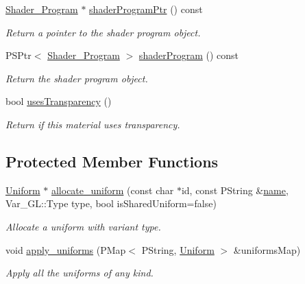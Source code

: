 \begin{DoxyCompactItemize}
\mbox{\hyperlink{classprz_1_1_shader___program}{Shader\+\_\+\+Program}} $\ast$ \mbox{\hyperlink{classprz_1_1_material_aee5bc4a466d97ffff49ff02bbc41bae6}{shader\+Program\+Ptr}} () const
\begin{DoxyCompactList}\small\item\em Return a pointer to the shader program object. \end{DoxyCompactList}\item 
P\+S\+Ptr$<$ \mbox{\hyperlink{classprz_1_1_shader___program}{Shader\+\_\+\+Program}} $>$ \mbox{\hyperlink{classprz_1_1_material_a258f2af6b3141b29ecc1c07968da1e0a}{shader\+Program}} () const
\begin{DoxyCompactList}\small\item\em Return the shader program object. \end{DoxyCompactList}\item 
bool \mbox{\hyperlink{classprz_1_1_material_aa27abc0a7c69fa88cac4d075a082d78c}{uses\+Transparency}} ()
\begin{DoxyCompactList}\small\item\em Return if this material uses transparency. \end{DoxyCompactList}\end{DoxyCompactItemize}
\subsection*{Protected Member Functions}
\begin{DoxyCompactItemize}
\item 
\mbox{\hyperlink{structprz_1_1_uniform}{Uniform}} $\ast$ \mbox{\hyperlink{classprz_1_1_material_ae87c21c227dbbc14239a8c375b751720}{allocate\+\_\+uniform}} (const char $\ast$id, const P\+String \&\mbox{\hyperlink{classprz_1_1_material_ab1b2f9074aea77954b1ad70b72f48c3a}{name}}, Var\+\_\+\+G\+L\+::\+Type type, bool is\+Shared\+Uniform=false)
\begin{DoxyCompactList}\small\item\em Allocate a uniform with variant type. \end{DoxyCompactList}\item 
void \mbox{\hyperlink{classprz_1_1_material_a537b0e3e75e1a8309f30326541344589}{apply\+\_\+uniforms}} (P\+Map$<$ P\+String, \mbox{\hyperlink{structprz_1_1_uniform}{Uniform}} $>$ \&uniforms\+Map)
\begin{DoxyCompactList}\small\item\em Apply all the uniforms of any kind. \end{DoxyCompactList}\end{DoxyCompactItemize}
